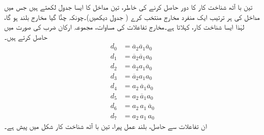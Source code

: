 تین با آٹھ  شناخت کار کا دور حاصل کرنے کی خاطر،  تین مداخل کا  ایسا جدول لکھتے ہیں جس میں مداخل کی  ہر   ترتیب ایک منفرد مخارج
  منتخب  کرے ( جدول  دیکھیں)۔چونکہ چنُا گیا مخارج بلند ہو گا، لہٰذا ایسا شناخت کار،     کہلاتا ہے۔مخارج تفاعلات کی مساوات،      مجموعہ ارکان ضرب کی صورت میں حاصل کرتے ہیں۔
\begin{align*}
d_0&=\overline{a}_2  \overline{a}_1  \overline{a}_0\\
d_1&=\overline{a}_2  \overline{a}_1  a_0\\
d_2&=\overline{a}_2  a_1  \overline{a}_0\\
d_3&=\overline{a}_2  a_1  a_0\\
d_4&=a_2\,  \overline{a}_1  \overline{a}_0\\
d_5&=a_2\,  \overline{a}_1  a_0\\
d_6&=a_2\,  a_1\,  \overline{a}_0\\
d_7&=a_2\, a_1\, a_0
\end{align*}
ان تفاعلات سے حاصل، بلند عمل پیرا،  تین با آٹھ   شناخت کار شکل  میں پیش ہے۔
